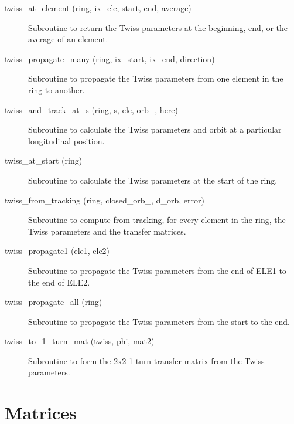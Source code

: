 \begin{description}
\item[twiss\_at\_element (ring, ix\_ele, start, end, average)] \Newline
Subroutine to return the Twiss parameters at the beginning, end, or the average of an element. 

\item[twiss\_propagate\_many (ring, ix\_start, ix\_end, direction)] \Newline
Subroutine to propagate the Twiss parameters from one element in the ring to another. 

\item[twiss\_and\_track\_at\_s (ring, s, ele, orb\_, here)] \Newline
Subroutine to calculate the Twiss parameters and orbit at a particular longitudinal position. 

\item[twiss\_at\_start (ring)] \Newline
Subroutine to calculate the Twiss parameters at the start of the ring. 

\item[twiss\_from\_tracking (ring, closed\_orb\_, d\_orb, error)] \Newline
Subroutine to compute from tracking, for every element in the ring, 
the Twiss parameters and the transfer matrices. 

\item[twiss\_propagate1 (ele1, ele2)] \Newline
Subroutine to propagate the Twiss parameters from the end of ELE1 to the end of ELE2. 

\item[twiss\_propagate\_all (ring)] \Newline
Subroutine to propagate the Twiss parameters from the start to the end. 

\item[twiss\_to\_1\_turn\_mat (twiss, phi, mat2)] \Newline
Subroutine to form the 2x2 1-turn transfer matrix from the Twiss parameters. 

\end{description}

\section{Matrices}
\label{r:mat}

